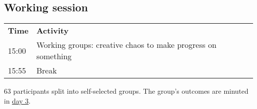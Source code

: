 \subsection{Working session}

\begin{table}[!h]
    \centering
    \begin{tabular}{@{}
        |p{}
        |p{}
        |@{}}
    \rowcolor{Task32Blue2} \textbf{Time} & \textbf{Activity} \\
    15:00 & Working groups: creative chaos to make progress on something \\
    15:55 & Break \\
    \end{tabular}
    \label{tab:day1-workingsession-agenda}
\end{table}

63 participants split into self-selected groups. The group's outcomes are minuted in \hyperref[sec:reporting]{day 3}.
